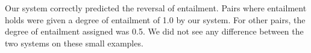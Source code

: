 \documentclass[11pt]{article}
\theoremstyle{definition}
\begin{document}
Our system correctly predicted the reversal of entailment. Pairs where entailment
holds were given a degree of entailment of 1.0 by our
system. For other pairs, the degree of entailment assigned was  0.5. We did not see any difference between the two
systems on these small examples.





\end{document}
